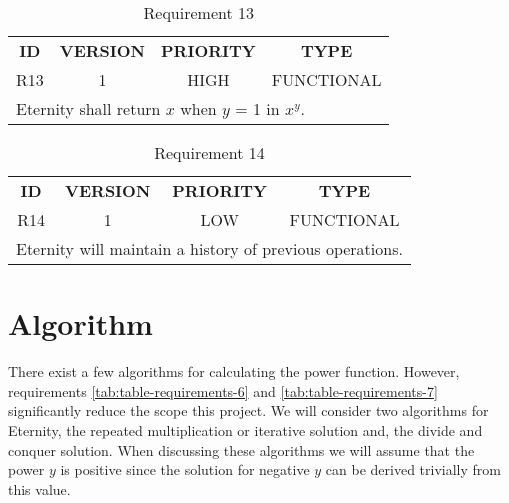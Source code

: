 \documentclass[11pt,a4paper]{report}
\theoremstyle{definition}
\theoremstyle{remark}
\begin{document}
            \begin{table}[ht]
            \centering
                \begin{tabular}{cccc} %
                    \textbf{ID} & \textbf{VERSION} & \textbf{PRIORITY} & \textbf{TYPE}\\
                            R13  &           1      &           HIGH    &      FUNCTIONAL\\
                    \hline
                    \multicolumn{4}{l}{Eternity shall return $x$ when $y$ = 1 in $x^y$.}
                \end{tabular}
                \caption{Requirement 13}
                \label{tab:table-requirements-13}
            \end{table}
            \vspace{3em}
            
            \begin{table}[ht]
            \centering
                \begin{tabular}{cccc} %
                    \textbf{ID} & \textbf{VERSION} & \textbf{PRIORITY} & \textbf{TYPE}\\
                            R14  &           1      &           LOW    &      FUNCTIONAL\\
                    \hline
                    \multicolumn{4}{l}{Eternity will maintain a history of previous operations.}
                \end{tabular}
                \caption{Requirement 14}
                \label{tab:table-requirements-14}
            \end{table}
            \vspace{3em}

    \chapter{Algorithm}
            There exist a few algorithms for calculating the power function. However, requirements \ref{tab:table-requirements-6} and \ref{tab:table-requirements-7} significantly reduce the scope this project.
            We will consider two algorithms for Eternity, the repeated multiplication or iterative solution and, the divide and conquer solution.
            When discussing these algorithms we will assume that the power $y$ is positive since the solution for negative $y$ can be derived trivially from this value.
\end{document}
